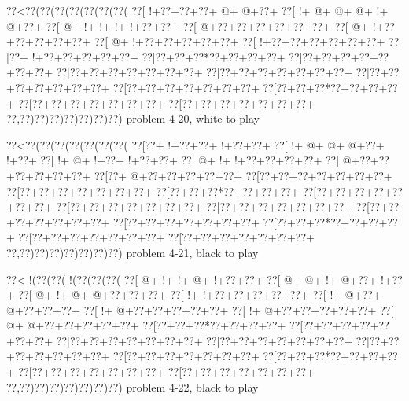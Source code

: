 \vbox{\vbox{\goo
\0??<\0??(\0??(\0??(\0??(\0??(\0??(\0??(
\0??[\- !+\0??+\0??+\0??+\- @+\- @+\0??+
\0??[\- !+\- @+\- @+\- @+\- !+\- @+\0??+
\0??[\- @+\- !+\- !+\- !+\- !+\0??+\0??+
\0??[\- @+\0??+\0??+\0??+\0??+\0??+\0??+
\0??[\- @+\- !+\0??+\0??+\0??+\0??+\0??+
\0??[\- @+\- !+\0??+\0??+\0??+\0??+\0??+
\0??[\- !+\0??+\0??+\0??+\0??+\0??+\0??+
\0??[\0??+\- !+\0??+\0??+\0??+\0??+\0??+
\0??[\0??+\0??+\0??*\0??+\0??+\0??+\0??+
\0??[\0??+\0??+\0??+\0??+\0??+\0??+\0??+
\0??[\0??+\0??+\0??+\0??+\0??+\0??+\0??+
\0??[\0??+\0??+\0??+\0??+\0??+\0??+\0??+
\0??[\0??+\0??+\0??+\0??+\0??+\0??+\0??+
\0??[\0??+\0??+\0??+\0??+\0??+\0??+\0??+
\0??[\0??+\0??+\0??*\0??+\0??+\0??+\0??+
\0??[\0??+\0??+\0??+\0??+\0??+\0??+\0??+
\0??[\0??+\0??+\0??+\0??+\0??+\0??+\0??+
\0??,\0??)\0??)\0??)\0??)\0??)\0??)\0??)
}
\hfil problem 4-20, white to play\hfil\break
}

\vbox{\vbox{\goo
\0??<\0??(\0??(\0??(\0??(\0??(\0??(\0??(
\0??[\0??+\- !+\0??+\0??+\- !+\0??+\0??+
\0??[\- !+\- @+\- @+\- @+\0??+\- !+\0??+
\0??[\- !+\- @+\- !+\0??+\- !+\0??+\0??+
\0??[\- @+\- !+\- !+\0??+\0??+\0??+\0??+
\0??[\- @+\0??+\0??+\0??+\0??+\0??+\0??+
\0??[\0??+\- @+\0??+\0??+\0??+\0??+\0??+
\0??[\0??+\0??+\0??+\0??+\0??+\0??+\0??+
\0??[\0??+\0??+\0??+\0??+\0??+\0??+\0??+
\0??[\0??+\0??+\0??*\0??+\0??+\0??+\0??+
\0??[\0??+\0??+\0??+\0??+\0??+\0??+\0??+
\0??[\0??+\0??+\0??+\0??+\0??+\0??+\0??+
\0??[\0??+\0??+\0??+\0??+\0??+\0??+\0??+
\0??[\0??+\0??+\0??+\0??+\0??+\0??+\0??+
\0??[\0??+\0??+\0??+\0??+\0??+\0??+\0??+
\0??[\0??+\0??+\0??*\0??+\0??+\0??+\0??+
\0??[\0??+\0??+\0??+\0??+\0??+\0??+\0??+
\0??[\0??+\0??+\0??+\0??+\0??+\0??+\0??+
\0??,\0??)\0??)\0??)\0??)\0??)\0??)\0??)
}
\hfil problem 4-21, black to play\hfil\break
}

\vbox{\vbox{\goo
\0??<\- !(\0??(\0??(\- !(\0??(\0??(\0??(
\0??[\- @+\- !+\- !+\- @+\- !+\0??+\0??+
\0??[\- @+\- @+\- !+\- @+\0??+\- !+\0??+
\0??[\- @+\- !+\- @+\- @+\0??+\0??+\0??+
\0??[\- !+\- !+\0??+\0??+\0??+\0??+\0??+
\0??[\- !+\- @+\0??+\- @+\0??+\0??+\0??+
\0??[\- !+\- @+\0??+\0??+\0??+\0??+\0??+
\0??[\- !+\- @+\0??+\0??+\0??+\0??+\0??+
\0??[\- @+\- @+\0??+\0??+\0??+\0??+\0??+
\0??[\0??+\0??+\0??*\0??+\0??+\0??+\0??+
\0??[\0??+\0??+\0??+\0??+\0??+\0??+\0??+
\0??[\0??+\0??+\0??+\0??+\0??+\0??+\0??+
\0??[\0??+\0??+\0??+\0??+\0??+\0??+\0??+
\0??[\0??+\0??+\0??+\0??+\0??+\0??+\0??+
\0??[\0??+\0??+\0??+\0??+\0??+\0??+\0??+
\0??[\0??+\0??+\0??*\0??+\0??+\0??+\0??+
\0??[\0??+\0??+\0??+\0??+\0??+\0??+\0??+
\0??[\0??+\0??+\0??+\0??+\0??+\0??+\0??+
\0??,\0??)\0??)\0??)\0??)\0??)\0??)\0??)
}
\hfil problem 4-22, black to play\hfil\break
}

